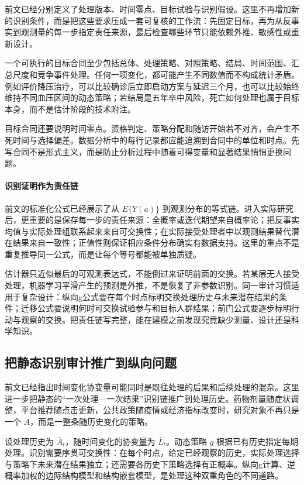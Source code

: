 前文已经分别定义了处理版本、时间零点、目标试验与识别假设。这里不再增加新的识别条件，而是把这些要求压成一套可复核的工作流：先固定目标，再为从反事实到观测量的每一步指定责任来源，最后检查哪些环节只能依赖外推、敏感性或重新设计。

一个可执行的目标合同至少包括总体、处理策略、对照策略、结局、时间范围、汇总尺度和竞争事件处理。任何一项变化，都可能产生不同数值而不构成统计矛盾。例如评价降压治疗，可以比较确诊后立即启动方案与延迟三个月，也可以比较始终维持不同血压区间的动态策略；若结局是五年卒中风险，死亡如何处理也属于目标本身，而不是估计阶段的技术附注。

目标合同还要说明时间零点。资格判定、策略分配和随访开始若不对齐，会产生不死时间与选择偏差。数据分析中的每行记录都应能追溯到合同中的单位和时点。先写合同不是形式主义，而是防止分析过程中随着可得变量和显著结果悄悄更换问题。

\paragraph{识别证明作为责任链}

前文的标准化公式已经展示了从 $E\{Y(a)\}$ 到观测分布的等式链。进入实际研究后，更重要的是保存每一步的责任来源：全概率或迭代期望来自概率论；把反事实均值与实际处理组联系起来来自可交换性；在实际接受处理者中以观测结果替代潜在结果来自一致性；正值性则保证相应条件分布确实有数据支持。这里的重点不是重复推导同一公式，而是让每个等号都能被单独质疑。

估计器只近似最后的可观测表达式，不能倒过来证明前面的交换。若某层无人接受处理，机器学习平滑产生的预测是外推，不是恢复了非参数识别。同一审计习惯适用于复杂设计：纵向g公式要在每个时点标明交换处理历史与未来潜在结果的条件；迁移公式要说明何时可交换试验参与和目标人群结果；前门公式要逐步标明行动与观察的交换。把责任链写完整，能在建模之前发现究竟缺少测量、设计还是科学知识。

\subsection{把静态识别审计推广到纵向问题}

前文已经指出时间变化协变量可能同时是既往处理的后果和后续处理的混杂。这里进一步把静态的“一次处理---一次结果”识别链推广到处理历史。药物剂量随症状调整，平台推荐随点击更新，公共政策随疫情或经济指标改变时，研究对象不再只是一个 $A$，而是一整条随历史变化的策略。

设处理历史为 $\bar A_t$，随时间变化的协变量为 $\bar L_t$。动态策略 $g$ 根据已有历史指定每期处理。识别需要序贯可交换性：在每个时点，给定已经观察的历史，实际处理选择与策略下未来潜在结果独立；还需要各历史下策略选择有正概率。纵向g计算、逆概率加权的边际结构模型和结构嵌套模型，是处理这种双重角色的不同道路。

